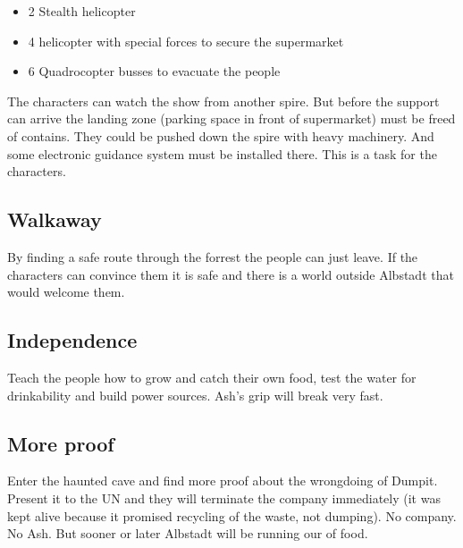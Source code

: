 \begin{itemize}
    \item 2 Stealth helicopter
    \item 4 helicopter with special forces to secure the supermarket
    \item 6 Quadrocopter busses to evacuate the people
\end{itemize}

The characters can watch the show from another spire. But before the support can arrive the landing zone (parking space in front of supermarket) must be freed of contains. They could be pushed down the spire with heavy machinery. And some electronic guidance system must be installed there. This is a task for the characters.

\subsection{Walkaway}

By finding a safe route through the forrest the people can just leave. If the characters can convince them it is safe and there is a world outside Albstadt that would welcome them.

\subsection{Independence}

Teach the people how to grow and catch their own food, test the water for drinkability and build power sources. Ash's grip will break very fast.

\subsection{More proof}

Enter the haunted cave and find more proof about the wrongdoing of Dumpit. Present it to the UN and they will terminate the company immediately (it was kept alive because it promised recycling of the waste, not dumping). No company. No Ash. But sooner or later Albstadt will be running our of food.




